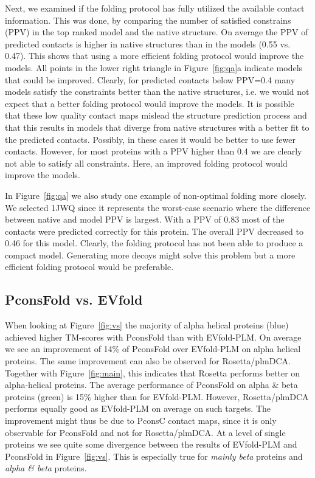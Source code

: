\documentclass{bioinfo}
\begin{document}
Next, we examined if the folding protocol has fully utilized the
available contact information. This was done, by comparing the number
of satisfied constrains (PPV) in the top ranked model and the native
structure.  On average the PPV of predicted contacts is higher in
native structures than in the models (0.55 vs. 0.47). This shows that
using a more efficient folding protocol would improve the models. All
points in the lower right triangle in Figure~\ref{fig:qa}a indicate
models that could be improved.  Clearly, for predicted contacts below
PPV=0.4 many models satisfy the constraints better than the native
structures, i.e. we would not expect that a better folding protocol
would improve the models.  It is possible that these low quality
contact maps mislead the structure prediction process and that this
results in models that diverge from native structures with a better
fit to the predicted contacts. Possibly, in these cases it would be
better to use fewer contacts. 
However, for most proteins with a PPV higher than 0.4 we are
clearly not able to satisfy all constraints. Here, an improved folding
protocol would improve the models.


In Figure~\ref{fig:qa} we also study one example of non-optimal
folding more closely. We selected 1JWQ since it represents the
worst-case scenario where the difference between native and model PPV
is largest. With a PPV of 0.83 most of the contacts were predicted
correctly for this protein. The overall PPV decreased to 0.46 for this
model. Clearly, the folding protocol has not been able to produce a
compact model. Generating more decoys might solve this problem but a
more efficient folding protocol would be preferable.







\subsection{PconsFold vs. EVfold }

When looking at Figure~\ref{fig:vs} the majority of alpha helical
proteins (blue) achieved higher TM-scores with PconsFold than with
EVfold-PLM. On average we see an improvement of 14\% of PconsFold over
EVfold-PLM on alpha helical proteins. The same improvement can also be
observed for Rosetta/plmDCA. Together with Figure~\ref{fig:main},
this indicates that Rosetta performs better on alpha-helical
proteins. The average
performance of PconsFold on alpha \& beta proteins (green) is 15\%
higher than for EVfold-PLM. However, Rosetta/plmDCA performs equally good
as EVfold-PLM on average on such targets. The improvement might thus be
due to PconsC contact maps, since it is only observable for PconsFold
and not for Rosetta/plmDCA. At a level of single proteins we see quite
some divergence between the results of EVfold-PLM and PconsFold in
Figure~\ref{fig:vs}. This is especially true for {\em mainly beta}
proteins and {\em alpha \& beta} proteins.
\end{document}
